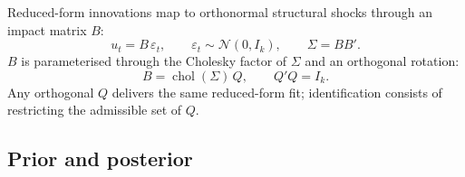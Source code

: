 Reduced-form innovations map to orthonormal structural shocks through an impact matrix $B$:
\begin{equation}
u_t = B\,\varepsilon_t, \qquad \varepsilon_t \sim \mathcal{N}(0, I_k), \qquad \Sigma = BB'.
\label{eq:structural}
\end{equation}
$B$ is parameterised through the Cholesky factor of $\Sigma$ and an orthogonal rotation:
\begin{equation}
B = \operatorname{chol}(\Sigma)\, Q, \qquad Q'Q = I_k .
\label{eq:rotation}
\end{equation}
Any orthogonal $Q$ delivers the same reduced-form fit; identification consists of restricting the admissible set of $Q$.

\subsection{Prior and posterior}
\label{sec:estimation}

